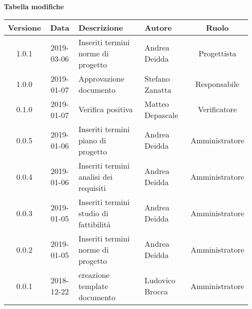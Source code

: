 \begin{center}
	\textbf{Tabella modifiche}
	\end{center}
	\begin{center}
		\begin{tabularx}{\textwidth}{|c|c|X|X|c|}
			\hline
			\textbf{Versione} & \textbf{Data} & \textbf{Descrizione} & \textbf{Autore} & \textbf{Ruolo} \\
			\hline
			1.0.1 & 2019-03-06 & Inseriti termini norme di progetto & Andrea Deidda & Progettista \\
			\hline
			1.0.0 & 2019-01-07 & Approvazione documento & Stefano Zanatta & Responsabile \\
			\hline
			0.1.0 & 2019-01-07 & Verifica positiva & Matteo Depascale & Verificatore \\
			\hline
			0.0.5 & 2019-01-06 & Inseriti termini piano di progetto & Andrea Deidda & Amministratore\\
			\hline
			0.0.4 & 2019-01-06 & Inseriti termini analisi dei requisiti & Andrea Deidda & Amministratore\\
			\hline
			0.0.3 & 2019-01-05 & Inseriti termini studio di fattibilità & Andrea Deidda & Amministratore\\
			\hline
			0.0.2 & 2019-01-05 & Inseriti termini norme di progetto & Andrea Deidda & Amministratore\\
			\hline
			0.0.1 & 2018-12-22 & creazione template documento & Ludovico Brocca & Amministratore\\
			\hline
		\end{tabularx}
	\end{center}
\newpage